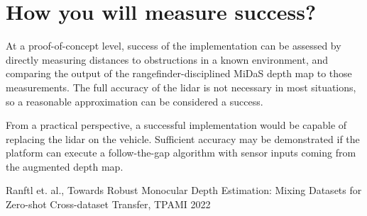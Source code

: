 \documentclass[conference]{IEEEtran}
\begin{document}
\FloatBarrier

\section{How you will measure success?}
At a proof-of-concept level, success of the implementation can be assessed
by directly measuring distances to obstructions in a known environment, and
comparing the output of the rangefinder-disciplined MiDaS depth map to those
measurements. The full accuracy of the lidar is not necessary in most
situations, so a reasonable approximation can be considered a success.

From a practical perspective, a successful implementation would be capable of
replacing the lidar on the vehicle. Sufficient accuracy may be demonstrated if
the platform can execute a follow-the-gap algorithm with sensor inputs coming
from the augmented depth map.


\begin{thebibliography}{00}
 Ranftl et. al., Towards Robust Monocular Depth Estimation:
Mixing Datasets for Zero-shot Cross-dataset Transfer, TPAMI 2022
\end{thebibliography}
\end{document}

